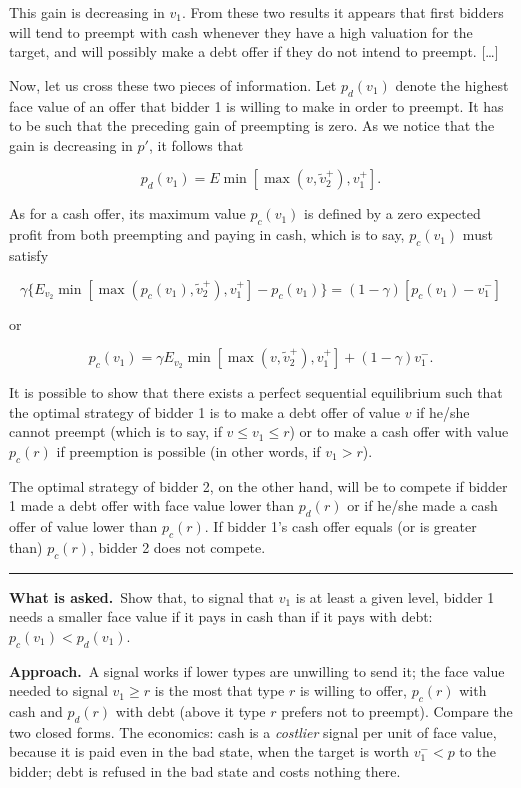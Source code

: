 \documentclass[11pt,a4paper]{article}
\newcommand{\asked}{\par\medskip\noindent\textbf{What is asked.}~}
\newcommand{\approach}{\par\smallskip\noindent\textbf{Approach.}~}
\newcommand{\stmtend}{\par\endgroup\nopagebreak\noindent\rule{\linewidth}{0.4pt}\par\medskip}
\begin{document}
This gain is decreasing in \(v_1\). From these two results it appears that first bidders will tend
to preempt with cash whenever they have a high valuation for the target, and will possibly make a
debt offer if they do not intend to preempt. {[}\ldots{]}

Now, let us cross these two pieces of information. Let \(p_d(v_1)\) denote the highest face value of
an offer that bidder 1 is willing to make in order to preempt. It has to be such that the preceding
gain of preempting is zero. As we notice that the gain is decreasing in \(p'\), it follows that

\[p_d(v_1) = E\min[\max(v, \tilde v_2^+), v_1^+].\]

As for a cash offer, its maximum value \(p_c(v_1)\) is defined by a zero expected profit from both
preempting and paying in cash, which is to say, \(p_c(v_1)\) must satisfy

\[\gamma\{E_{v_2}\min[\max(p_c(v_1), \tilde v_2^+), v_1^+] - p_c(v_1)\} = (1 - \gamma)[p_c(v_1) - v_1^-]\]

or

\[p_c(v_1) = \gamma E_{v_2}\min[\max(v, \tilde v_2^+), v_1^+] + (1 - \gamma)v_1^-.\]

It is possible to show that there exists a perfect sequential equilibrium such that the optimal
strategy of bidder 1 is to make a debt offer of value \(v\) if he/she cannot preempt (which is to
say, if \(v \leq v_1 \leq r\)) or to make a cash offer with value \(p_c(r)\) if preemption is
possible (in other words, if \(v_1 > r\)).

The optimal strategy of bidder 2, on the other hand, will be to compete if bidder 1 made a debt
offer with face value lower than \(p_d(r)\) or if he/she made a cash offer of value lower than
\(p_c(r)\). If bidder 1's cash offer equals (or is greater than) \(p_c(r)\), bidder 2 does not
compete.
\stmtend

\asked Show that, to signal that $v_1$ is at least a given level, bidder 1 needs a smaller face value
if it pays in cash than if it pays with debt: $p_c(v_1)<p_d(v_1)$.

\approach A signal works if lower types are unwilling to send it; the face value needed to signal
$v_1\ge r$ is the most that type $r$ is willing to offer, $p_c(r)$ with cash and $p_d(r)$ with debt
(above it type $r$ prefers not to preempt). Compare the two closed forms. The economics: cash is a
\emph{costlier} signal per unit of face value, because it is paid even in the bad state, when the
target is worth $v_1^-<p$ to the bidder; debt is refused in the bad state and costs nothing there.
\end{document}
